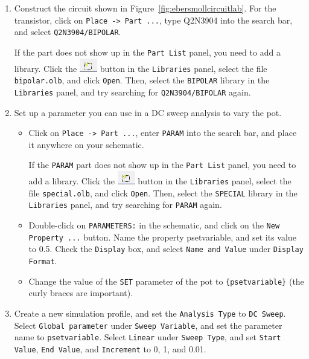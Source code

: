 \documentclass[11pt]{article}
\begin{document}
\begin{enumerate}
\item Construct the circuit shown in
  Figure~\ref{fig:ebersmollcircuitlab}. For the transistor, click on
  \texttt{Place -> Part ...}, type Q2N3904 into the search bar, and
  select \texttt{Q2N3904/BIPOLAR}.

  If the part does not show up in the \texttt{Part List} panel, you
  need to add a library. Click the \includegraphics{OrCAD_AddLib.png}
  button in the \texttt{Libraries} panel, select the file
  \texttt{bipolar.olb}, and click \texttt{Open}. Then, select the
  \texttt{BIPOLAR} library in the \texttt{Libraries} panel, and try
  searching for \texttt{Q2N3904/BIPOLAR} again.
  
\item Set up a parameter you can use in a DC sweep analysis to vary
  the pot.
  \begin{itemize}
    \item Click on \texttt{Place -> Part ...}, enter \texttt{PARAM} into
      the search bar, and place it anywhere on your schematic.

      If the \texttt{PARAM} part does not show up in the
      \texttt{Part List} panel, you need to add a library. Click the
      \includegraphics{OrCAD_AddLib.png} button in the
      \texttt{Libraries} panel, select the file \texttt{special.olb}, 
      and click \texttt{Open}. Then, select  the \texttt{SPECIAL}
      library in the \texttt{Libraries} panel, and try searching for
      \texttt{PARAM} again. 
      
    \item Double-click on \texttt{PARAMETERS:} in the schematic, and
      click on the \texttt{New Property ...} button. Name the property
      psetvariable, and set its value to 0.5. Check the
      \texttt{Display} box, and select \texttt{Name and Value} under
      \texttt{Display Format}.
    \item Change the value of the \texttt{SET} parameter of the pot to
      \verb+{psetvariable}+ (the curly braces are important).
  \end{itemize}

\item Create a new simulation profile, and set the \texttt{Analysis
  Type} to \texttt{DC Sweep}. Select \texttt{Global parameter} under
  \texttt{Sweep Variable}, and set the parameter name to
  \texttt{psetvariable}. Select \texttt{Linear} under \texttt{Sweep
    Type}, and set \texttt{Start Value}, \texttt{End Value}, and
  \texttt{Increment} to 0, 1, and 0.01.


\end{enumerate}
\end{document}
